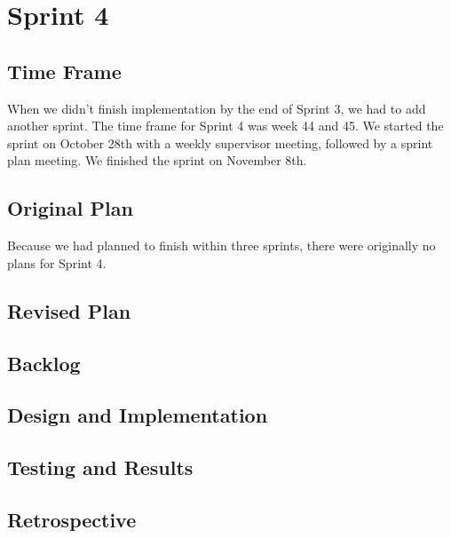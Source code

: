 \section{Sprint 4}
\subsection{Time Frame}
When we didn't finish implementation by the end of Sprint 3, we had to add another sprint. The time frame for Sprint 4 was week 44 and 45. We started the sprint on October 28th with a weekly supervisor meeting, followed by a sprint plan meeting. We finished the sprint on November 8th.
\subsection{Original Plan}
Because we had planned to finish within three sprints, there were originally no plans for Sprint 4.
\subsection{Revised Plan}
\subsection{Backlog}
\subsection{Design and Implementation}
\subsection{Testing and Results}
\subsection{Retrospective}
